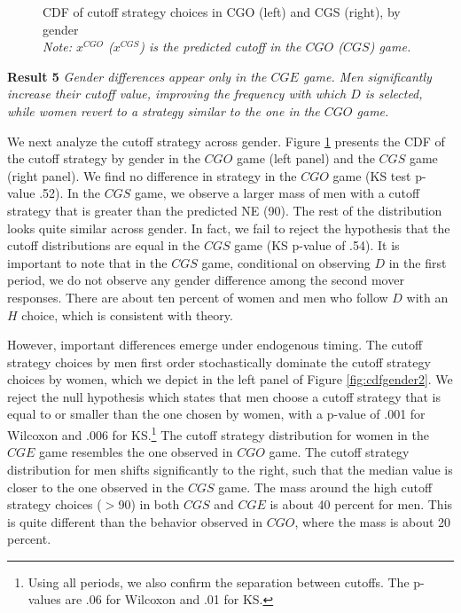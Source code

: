 \documentclass[11pt, letterpaper]{article}
\theoremstyle{plain}
\begin{document}
\begin{center}
\begin{figure}[ht]
\centering{}%
\begin{minipage}[t]{0.45\columnwidth}%
%
\end{minipage}%
\begin{minipage}[t]{0.45\columnwidth}%
%
\end{minipage} 
\caption{CDF of cutoff strategy choices in CGO (left) and CGS (right), by gender \\\footnotesize{\textit{Note: $x^{CGO}$ ($x^{CGS}$) is the predicted cutoff in the $CGO$ ($CGS$) game.}} }
\label{fig:cdfgender1}\end{figure}
\par\end{center}

\noindent \textbf{Result 5}
\textit{Gender differences appear only in the $CGE$ game. Men significantly increase their cutoff value, improving the frequency with which $D$ is selected, while women revert to a strategy similar to the one in the $CGO$ game.}

We next analyze the cutoff strategy across gender. Figure \ref{fig:cdfgender1} presents the CDF of the cutoff strategy by gender in the $CGO$ game (left panel) and the $CGS$  game (right panel). We find no difference in strategy in the $CGO$ game (KS test p-value .52). In the $CGS$ game, we observe a larger mass of men with a cutoff strategy that is greater than the predicted NE (90). The rest of the distribution looks quite similar across gender. In fact, we fail to reject the hypothesis that the cutoff distributions are equal in the $CGS$ game (KS p-value of .54). It is important to note that in the $CGS$ game, conditional on observing $D$ in the first period, we do not observe any gender difference among the second mover responses. There are about ten percent of women and men who follow $D$ with an $H$ choice, which is consistent with theory.

However, important differences emerge under endogenous timing. The cutoff strategy choices by men first order stochastically dominate the cutoff strategy choices by women, which we depict in the left panel of Figure \ref{fig:cdfgender2}. We reject the null hypothesis which states that men choose a cutoff strategy that is equal to or smaller than the one chosen by women, with a p-value of .001 for Wilcoxon and .006 for KS.\footnote{Using all periods, we also confirm the separation between cutoffs. The p-values are .06 for Wilcoxon and .01 for KS.} The cutoff strategy distribution for women in the $CGE$ game resembles the one observed in $CGO$ game. The cutoff strategy distribution for men shifts significantly to the right, such that the median value is closer to the one observed in the $CGS$ game. The mass around the high cutoff strategy choices ($>$90) in both $CGS$ and $CGE$ is about 40 percent for men. This is quite different than the behavior observed in $CGO$, where the mass is about 20 percent. 
\end{document}
